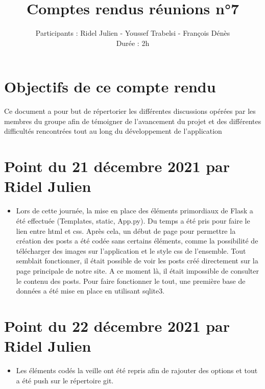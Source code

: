 \documentclass{article}
\title{\Huge Comptes rendus réunions n°7}
\author{Participants : Ridel Julien - Youssef Trabelsi - François Dénès \\ Durée : 2h}
\begin{document}
\maketitle

\section{\huge Objectifs de ce compte rendu }

\Large Ce document a pour but de répertorier les différentes discussions opérées par les membres du groupe afin de témoigner de l'avancement du projet et des différentes difficultés rencontrées tout au long du développement de l'application 

\section{\huge Point du 21 décembre 2021 par Ridel Julien}

\begin{itemize}

    \item \Large Lors de cette journée, la mise en place des éléments primordiaux de Flask a été effectuée (Templates, static, App.py). Du temps a été pris pour faire le lien entre html et css. Après cela, un début de page pour permettre la création des posts a été codée sans certains éléments, comme la possibilité de télécharger des images sur l'application et le style css de l'ensemble. Tout semblait fonctionner, il était possible de voir les posts créé directement sur la page principale de notre site. A ce moment là, il était impossible de consulter le contenu des posts.
    Pour faire fonctionner le tout, une première base de données a été mise en place en utilisant sqlite3.

\end{itemize}

\section{\huge Point du 22 décembre 2021 par Ridel Julien}

\begin{itemize}

    \item \Large Les éléments codés la veille ont été repris afin de rajouter des options et tout a été push sur le répertoire git.

\end{itemize}
\end{document}

